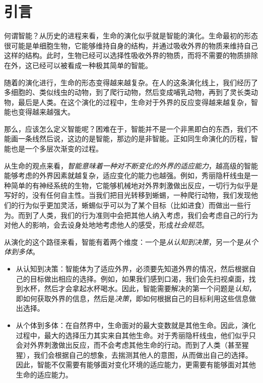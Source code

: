\chapter{引言}

何谓智能？从历史的进程来看，生命的演化似乎就是智能的演化。生命最初的形态很可能是单细胞生物，它能够维持自身的结构，并通过吸收外界的物质来维持自己这样的结构。此时，生物已经可以选择性吸收外界的物质，而将不需要的物质排除在外，这已经可以被看成一种极其简单的智能。

随着的演化进行，生命的形态变得越来越复杂。在人的这条演化线上，我们经历了多细胞的、类似线虫的动物，到了爬行动物，然后变成哺乳动物，再到了灵长类动物，最后是人类。在这个演化的过程中，生命对于外界的反应变得越来越复杂，智能也变得越来越强大。

那么，应该怎么定义智能呢？困难在于，智能并不是一个非黑即白的东西，我们不能画一条线然后说，这边的是智能，那边的是非智能。正如同生命演化的历程，智能也是一个多层次渐变的过程。

从生命的观点来看，\emph{智能意味着一种对不断变化的外界的适应能力}，越高级的智能能够考虑的外界因素就越复杂，适应变化的能力也越强。例如，秀丽隐杆线虫是一种简单的有神经系统的生物，它能够机械地对外界刺激做出反应，一切行为似乎是写好的，没有任何自主性。当我们把目光转移到蜥蜴，一种爬行动物，我们发现他们的行为似乎更加灵活，蜥蜴似乎可以为了某个目标（比如进食）而做出一些行为。而到了人类，我们的行为准则中会把其他人纳入考虑，我们会考虑自己的行为对他人的影响，会去设身处地地考虑他人的感受，形成\emph{社会规范}。

从演化的这个路径来看，智能有着两个维度：一个是\emph{从认知到决策}，另一个是\emph{从个体到多体}。
\begin{itemize}
    \item 从认知到决策：智能体为了适应外界，必须要先知道外界的情况，然后根据自己的目标做出相应的选择。例如，如果我们感到口渴，我们会先扫视桌面，找到水杯，然后才会拿起水杯喝水。因此，智能需要解决的第一个问题是\emph{认知}，即如何获取外界的信息，然后是\emph{决策}，即如何根据自己的目标利用这些信息做出选择。
    \item 从个体到多体：在自然界中，生命面对的最大变数就是其他生命。因此，演化过程中，最大的选择压力其实来自其他生命。对于秀丽隐杆线虫，他们似乎只会对外界刺激做出反应，而不会考虑其他生命的行动。而到了人类（甚至猩猩），我们会根据自己的想象，去揣测其他人的意图，从而做出自己的选择。因此，智能不仅需要有能够面对变化环境的适应能力，更需要有能够面对其他生命的适应能力。
\end{itemize}

